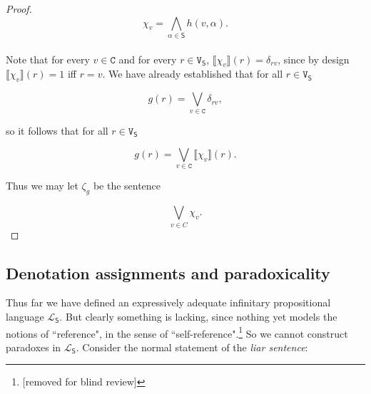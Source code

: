 \documentclass[12pt]{kluwer}
\newtheorem{defn}{Definition}
\theoremstyle{remark}
\newcommand{\fancy}[1]{\mathcal{#1}}
\def\S{\textsf{S}}
\def\V{\texttt{V}}
\def\C{\texttt{C}}
\def\L{\fancy{L}}
\begin{document}
\begin{proof}
\[\chi_v = \bigwedge_{\alpha \in \S} h(v, \alpha).\]\\


Note that for every $v \in \C$ and for every $r \in \V_{\S}$,  $\llbracket \chi_v\rrbracket(r) = \delta_{rv}$, since by design $\llbracket \chi_v\rrbracket(r)  = 1$ iff $r = v$. We have already established that for all $r \in \V_{\S}$

\[g(r) = \bigvee_{v \in \C} \delta_{rv},\]

so it follows that for all $r \in \V_{\S}$

\[g(r) = \bigvee_{v \in \C} \llbracket \chi_v\rrbracket(r).\]

Thus we may let $\zeta_g$ be the sentence 

\[\bigvee_{v \in C} \chi_v.\]
\end{proof}

%
\begin{comment}
\begin{defn}
For $\gamma \in \S^+$ we define its \emph{normal form} $\zeta_{\gamma}$ as $\zeta_{\llbracket\gamma\rrbracket}$.
\end{defn}

In our proofs, we will often encounter sentences like $\phi \wedge \neg \phi$ which always have the same semantic value.  

\begin{defn}
A sentence $\gamma \in \S^+$ is \emph{constant} if $\zeta_{\gamma} \in \{\top, \bot\}$.  Note that if $\gamma$ is a constant sentence, then there is a $c(\gamma) \in \{0, 1\}$ such that $\gamma(v) = c(\gamma)$ for every truth-value assignment $v$---we call $c(\gamma)$ the \emph{value} of the contant sentence $\gamma$.  
\end{defn}

This propositional language lacks a truth (or falsity) predicate but this leaves nothing wanting in terms of characterizing the problematic reference structures.
\end{comment}
%

\subsection{Denotation assignments and paradoxicality} 

Thus far we have defined an expressively adequate infinitary propositional language $\L_\S$. But clearly something is lacking, since nothing yet models the notions of ``reference", in the sense of ``self-reference".\footnote{[removed for blind review]}
So we cannot construct paradoxes in $\L_\S$. Consider the normal statement of the  \textit{liar sentence}:
\end{document}

